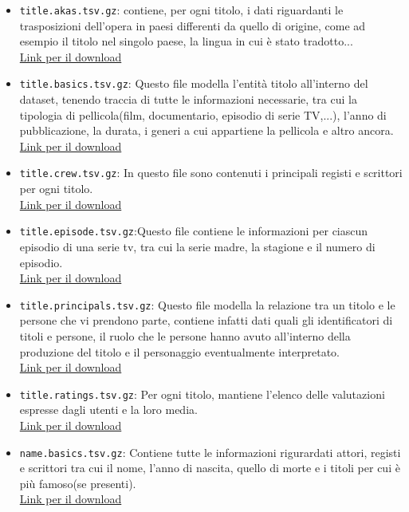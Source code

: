 \documentclass[hidelinks]{article}
\begin{document}
\begin{itemize}
	\item \texttt{title.akas.tsv.gz}: contiene, per ogni titolo, i dati riguardanti le trasposizioni dell'opera in paesi differenti da quello di origine, come ad esempio il titolo nel singolo paese, la lingua in cui è stato tradotto...\\
	\href{https://datasets.imdbws.com/title.akas.tsv.gz}{Link per il download}
	\item \texttt{title.basics.tsv.gz}: Questo file modella l'entità titolo all'interno del dataset, tenendo traccia di tutte le informazioni necessarie, tra cui la tipologia di pellicola(film, documentario, episodio di serie TV,...), l'anno di pubblicazione, la durata, i generi a cui appartiene la pellicola e altro ancora.\\
	\href{https://datasets.imdbws.com/title.basics.tsv.gz}{Link per il download}
	\item \texttt{title.crew.tsv.gz}: In questo file sono contenuti i principali registi e scrittori per ogni titolo.\\
	\href{https://datasets.imdbws.com/title.crew.tsv.gz}{Link per il download}
	\item \texttt{title.episode.tsv.gz}:Questo file contiene le informazioni per ciascun episodio di una serie tv, tra cui la serie madre, la stagione e il numero di episodio.\\
	\href{https://datasets.imdbws.com/title.episode.tsv.gz}{Link per il download}
	\item \texttt{title.principals.tsv.gz}: Questo file modella la relazione tra un titolo e le persone che vi prendono parte, contiene infatti dati quali gli identificatori di titoli e persone, il ruolo che le persone hanno avuto all'interno della produzione del titolo e il personaggio eventualmente interpretato.\\
	\href{https://datasets.imdbws.com/title.principals.tsv.gz}{Link per il download}
	\item \texttt{title.ratings.tsv.gz}: Per ogni titolo, mantiene l'elenco delle valutazioni espresse dagli utenti e la loro media.\\
	\href{https://datasets.imdbws.com/title.ratings.tsv.gz}{Link per il download}
	\item \texttt{name.basics.tsv.gz}: Contiene tutte le informazioni rigurardati attori, registi e scrittori tra cui il nome, l'anno di nascita, quello di morte e i titoli per cui è più famoso(se presenti).\\
	\href{https://datasets.imdbws.com/name.basics.tsv.gz}{Link per il download}
\end{itemize}
\end{document}
